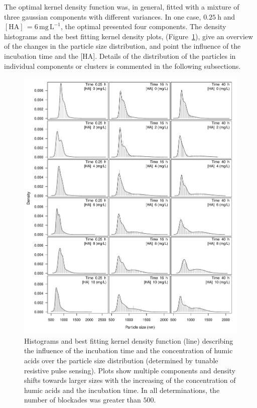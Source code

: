 \documentclass[journal=langd5,manuscript=article]{achemso}
\begin{document}
The optimal  kernel density function was, in general, fitted with a mixture of three gaussian components with different variances. In one case, $0.25~\mathrm{h}$ and $\mathrm{[HA]\, = 6\, mg\,L^{-1}}$, the optimal presented four components. The density histograms and the best fitting  kernel density plots, (Figure~\ref{fgr:multiplot_density}), give an overview  of the changes in the particle size distribution, and point the influence of the  incubation time and the [HA]. Details of the distribution of the particles in  individual components or clusters is commented in the following subsections.
% 
% 
 \begin{figure}
  \includegraphics[width=\linewidth]{Figures/MCluster_MS_HA_density.pdf}
  \caption{Histograms and best fitting kernel density function (line) describing the influence of the incubation time and the concentration of humic acids over the particle size distribution (determined by tunable resistive pulse sensing). Plots show multiple components and density shifts towards larger sizes with the increasing of the concentration of humic acids and the incubation time. In all determinations, the number of blockades was greater than $500$.} 
  \label{fgr:multiplot_density}
\end{figure}
\end{document}
